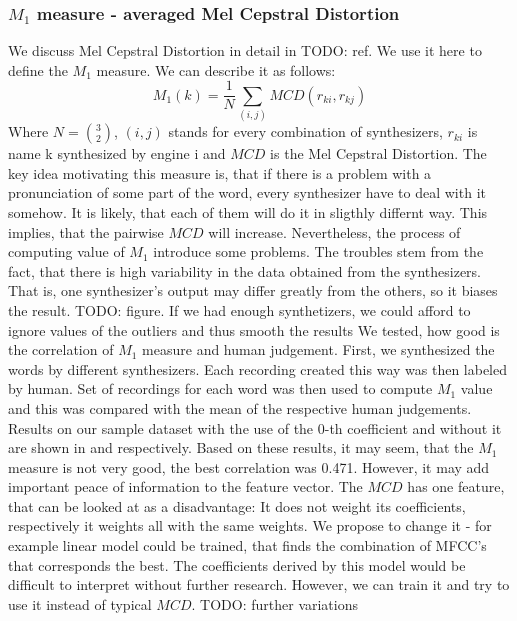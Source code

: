 \subsubsection{$M_1$ measure - averaged Mel Cepstral Distortion}
We discuss Mel Cepstral Distortion in detail in TODO: ref. We use it here to define the $M_1$ measure. We can describe it as follows:
\begin{equation}
M_1(k) = \frac{1}{N}\sum_{(i,j)}{MCD(r_{ki},r_{kj})}
\end{equation}
Where $N = {3\choose2}$, $(i,j)$ stands for every combination of synthesizers, $r_{ki}$ is name {k} synthesized by engine {i} and $MCD$ is the Mel Cepstral Distortion.
The key idea motivating this measure is, that if there is a problem with a pronunciation of some part of the word, every synthesizer have to deal with it somehow. It is likely, that each of them will do it in sligthly differnt way. This implies, that the pairwise $MCD$ will increase.
\linebreak \linebreak
Nevertheless, the process of computing value of $M_1$ introduce some problems. The troubles stem from the fact, that there is high variability in the data obtained from the synthesizers. That is, one synthesizer's output may differ greatly from the others, so it biases the result. TODO: figure. If we had enough synthetizers, we could afford to ignore values of the outliers and thus smooth the results
\linebreak \linebreak
We tested, how good is the correlation of $M_1$ measure and human judgement. First, we synthesized the words by different synthesizers. Each recording created this way was then labeled by human. Set of recordings for each word was then used to compute $M_1$ value and this was compared with the mean of the respective human judgements. Results on our sample dataset with the use of the $0$-th coefficient and without it are shown in  and  respectively. Based on these results, it may seem, that the $M_1$ measure is not very good, the best correlation was 0.471. However, it may add important peace of information to the feature vector.
\linebreak \linebreak
The $MCD$ has one feature, that can be looked at as a disadvantage: It does not weight its coefficients, respectively it weights all with the same weights. We propose to change it - for example linear model could be trained, that finds the combination of MFCC's that corresponds the best. The coefficients derived by this model would be difficult to interpret without further research. However, we can train it and try to use it instead of typical $MCD$. TODO: further variations
